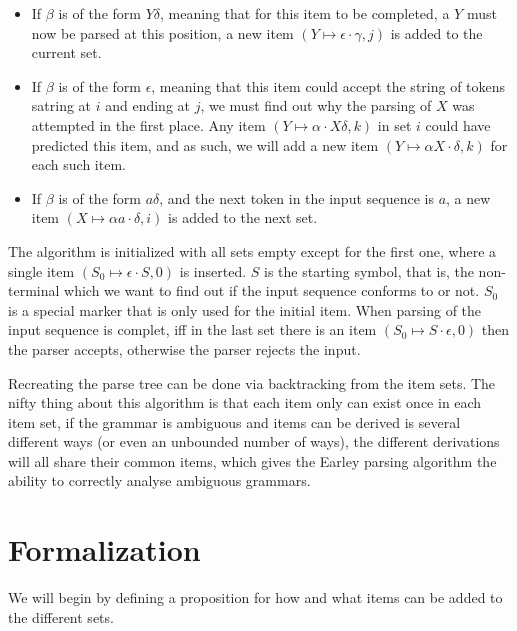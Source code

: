 		\begin{itemize}
			\item 
				If $\beta$ is of the form $Y\delta$, meaning that for this item
				to be completed, a $Y$ must now be parsed at this position, a 
				new item $(Y \mapsto \epsilon \cdot \gamma, j)$ is added to the 
				current set.
			
			\item
				If $\beta$ is of the form $\epsilon$, meaning that this item
				could accept the string of tokens satring at $i$ and ending at
				$j$, we must find out why the parsing of $X$ was attempted in
				the first place. Any item $(Y \mapsto \alpha \cdot X\delta, k)$
				in set $i$  could have predicted this item, and as such, we
				will add a new item $(Y \mapsto \alpha X \cdot \delta, k)$ for 
				each such item.
			
			\item
				If $\beta$ is of the form $a\delta$, and the next token in the 
				input sequence is $a$, a new item 
				$(X \mapsto \alpha a \cdot \delta, i)$ is added to the next 
				set.

		\end{itemize}
		
		The algorithm is initialized with all sets empty except for the first
		one, where a single item $(S_0 \mapsto \epsilon \cdot S, 0)$ is
		inserted.  $S$ is the starting symbol, that is, the non-terminal which
		we want to find out if the input sequence conforms to or not. $S_0$ is
		a special marker that is only used for the initial item. When parsing
		of the input sequence is complet, iff in the last set there is an item
		$(S_0 \mapsto S \cdot \epsilon, 0)$ then the parser accepts, otherwise
		the parser rejects the input.

		Recreating the parse tree can be done via backtracking from the item 
		sets. The nifty thing about this algorithm is that each item only can 
		exist once in each item set, if the grammar is ambiguous and items can 
		be derived is several different ways (or even an unbounded number of 
		ways), the different derivations will all share their common items, 
		which gives the Earley parsing algorithm the ability to correctly 
		analyse ambiguous grammars.

	\section{Formalization}
		
		We will begin by defining a proposition for how and what items can be 
		added to the different sets.

